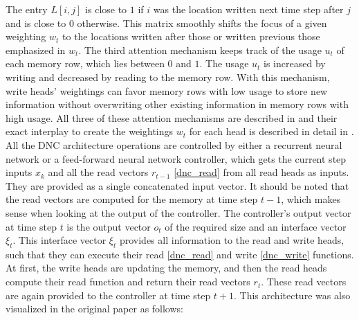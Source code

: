 \documentclass[draft,final]{vutinfth} %
\begin{document}
The entry $L[i,j]$ is close to $1$ if $i$ was the location written next time step after $j$ and is close to $0$ otherwise.
This matrix smoothly shifts the focus of a given weighting $w_t$ to the locations written after those or written previous those emphasized in $w_t$.
The third attention mechanism keeps track of the usage $u_t$ of each memory row, which lies between $0$ and $1$.
The usage $u_t$ is increased by writing and decreased by reading to the memory row.
With this mechanism, write heads' weightings can favor memory rows with low usage to store new information without overwriting other existing information in memory rows with high usage.
All three of these attention mechanisms are described in \cite[p. 1-2]{DNC} and their exact interplay to create the weightings $w_t$ for each head is described in detail in \cite[p. 7-8]{DNC}.
All the DNC architecture operations are controlled by either a recurrent neural network or a feed-forward neural network controller, which gets the current step inputs $x_k$ and all the read vectors $r_{t-1}$ \ref{dnc_read} from all read heads as inputs.
They are provided as a single concatenated input vector.
It should be noted that the read vectors are computed for the memory at time step $t-1$, which makes sense when looking at the output of the controller.
The controller's output vector at time step $t$ is the output vector $o_t$ of the required size and an interface vector $\xi_t$.
This interface vector $\xi_t$ provides all information to the read and write heads, such that they can execute their read \ref{dnc_read} and write \ref{dnc_write} functions.
At first, the write heads are updating the memory, and then the read heads compute their read function and return their read vectors $r_t$.
These read vectors are again provided to the controller at time step $t+1$.
This architecture was also visualized in the original paper as follows:
\end{document}
